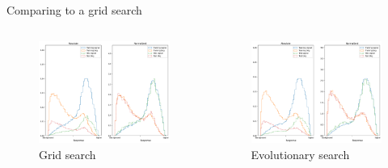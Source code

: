 \begin{frame}{Comparing to a grid search}
    \begin{columns}
        \begin{column}{0.5\textwidth}
            \begin{figure}
                \centering
                \includegraphics[width = \textwidth]{grid_response.png}
                \caption{Grid search}
            \end{figure}
        \end{column}
        \begin{column}{0.5\textwidth}
            \begin{figure}
                \centering
                \includegraphics[width = \textwidth]{evo_response.png}
                \caption{Evolutionary search}
            \end{figure}
        \end{column}
    \end{columns}
\end{frame}